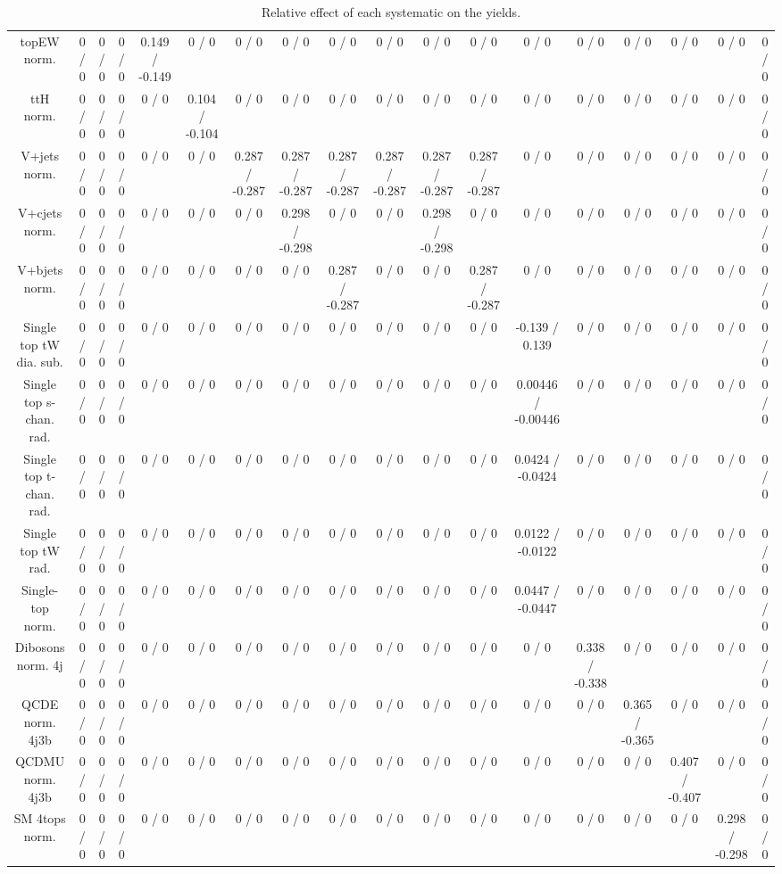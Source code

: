 \documentclass[10pt]{article}
\begin{document}
\begin{table}[htbp]
\begin{center}
\begin{tabular}{|c|c|c|c|c|c|c|c|c|c|c|c|c|c|c|c|c|c|}
  topEW norm. & 0 / 0 & 0 / 0 & 0 / 0 & 0.149 / -0.149 & 0 / 0 & 0 / 0 & 0 / 0 & 0 / 0 & 0 / 0 & 0 / 0 & 0 / 0 & 0 / 0 & 0 / 0 & 0 / 0 & 0 / 0 & 0 / 0 & 0 / 0 \\ 
  ttH norm. & 0 / 0 & 0 / 0 & 0 / 0 & 0 / 0 & 0.104 / -0.104 & 0 / 0 & 0 / 0 & 0 / 0 & 0 / 0 & 0 / 0 & 0 / 0 & 0 / 0 & 0 / 0 & 0 / 0 & 0 / 0 & 0 / 0 & 0 / 0 \\ 
  V+jets norm. & 0 / 0 & 0 / 0 & 0 / 0 & 0 / 0 & 0 / 0 & 0.287 / -0.287 & 0.287 / -0.287 & 0.287 / -0.287 & 0.287 / -0.287 & 0.287 / -0.287 & 0.287 / -0.287 & 0 / 0 & 0 / 0 & 0 / 0 & 0 / 0 & 0 / 0 & 0 / 0 \\ 
  V+cjets norm. & 0 / 0 & 0 / 0 & 0 / 0 & 0 / 0 & 0 / 0 & 0 / 0 & 0.298 / -0.298 & 0 / 0 & 0 / 0 & 0.298 / -0.298 & 0 / 0 & 0 / 0 & 0 / 0 & 0 / 0 & 0 / 0 & 0 / 0 & 0 / 0 \\ 
  V+bjets norm. & 0 / 0 & 0 / 0 & 0 / 0 & 0 / 0 & 0 / 0 & 0 / 0 & 0 / 0 & 0.287 / -0.287 & 0 / 0 & 0 / 0 & 0.287 / -0.287 & 0 / 0 & 0 / 0 & 0 / 0 & 0 / 0 & 0 / 0 & 0 / 0 \\ 
  Single top tW dia. sub. & 0 / 0 & 0 / 0 & 0 / 0 & 0 / 0 & 0 / 0 & 0 / 0 & 0 / 0 & 0 / 0 & 0 / 0 & 0 / 0 & 0 / 0 & -0.139 / 0.139 & 0 / 0 & 0 / 0 & 0 / 0 & 0 / 0 & 0 / 0 \\ 
  Single top s-chan. rad. & 0 / 0 & 0 / 0 & 0 / 0 & 0 / 0 & 0 / 0 & 0 / 0 & 0 / 0 & 0 / 0 & 0 / 0 & 0 / 0 & 0 / 0 & 0.00446 / -0.00446 & 0 / 0 & 0 / 0 & 0 / 0 & 0 / 0 & 0 / 0 \\ 
  Single top t-chan. rad. & 0 / 0 & 0 / 0 & 0 / 0 & 0 / 0 & 0 / 0 & 0 / 0 & 0 / 0 & 0 / 0 & 0 / 0 & 0 / 0 & 0 / 0 & 0.0424 / -0.0424 & 0 / 0 & 0 / 0 & 0 / 0 & 0 / 0 & 0 / 0 \\ 
  Single top tW rad. & 0 / 0 & 0 / 0 & 0 / 0 & 0 / 0 & 0 / 0 & 0 / 0 & 0 / 0 & 0 / 0 & 0 / 0 & 0 / 0 & 0 / 0 & 0.0122 / -0.0122 & 0 / 0 & 0 / 0 & 0 / 0 & 0 / 0 & 0 / 0 \\ 
  Single-top norm. & 0 / 0 & 0 / 0 & 0 / 0 & 0 / 0 & 0 / 0 & 0 / 0 & 0 / 0 & 0 / 0 & 0 / 0 & 0 / 0 & 0 / 0 & 0.0447 / -0.0447 & 0 / 0 & 0 / 0 & 0 / 0 & 0 / 0 & 0 / 0 \\ 
  Dibosons norm. 4j & 0 / 0 & 0 / 0 & 0 / 0 & 0 / 0 & 0 / 0 & 0 / 0 & 0 / 0 & 0 / 0 & 0 / 0 & 0 / 0 & 0 / 0 & 0 / 0 & 0.338 / -0.338 & 0 / 0 & 0 / 0 & 0 / 0 & 0 / 0 \\ 
  QCDE norm. 4j3b & 0 / 0 & 0 / 0 & 0 / 0 & 0 / 0 & 0 / 0 & 0 / 0 & 0 / 0 & 0 / 0 & 0 / 0 & 0 / 0 & 0 / 0 & 0 / 0 & 0 / 0 & 0.365 / -0.365 & 0 / 0 & 0 / 0 & 0 / 0 \\ 
  QCDMU norm. 4j3b & 0 / 0 & 0 / 0 & 0 / 0 & 0 / 0 & 0 / 0 & 0 / 0 & 0 / 0 & 0 / 0 & 0 / 0 & 0 / 0 & 0 / 0 & 0 / 0 & 0 / 0 & 0 / 0 & 0.407 / -0.407 & 0 / 0 & 0 / 0 \\ 
  SM 4tops norm. & 0 / 0 & 0 / 0 & 0 / 0 & 0 / 0 & 0 / 0 & 0 / 0 & 0 / 0 & 0 / 0 & 0 / 0 & 0 / 0 & 0 / 0 & 0 / 0 & 0 / 0 & 0 / 0 & 0 / 0 & 0.298 / -0.298 & 0 / 0 \\ 
\hline 
\end{tabular} 
\caption{Relative effect of each systematic on the yields.} 
\end{center} 
\end{table} 
\end{document}

